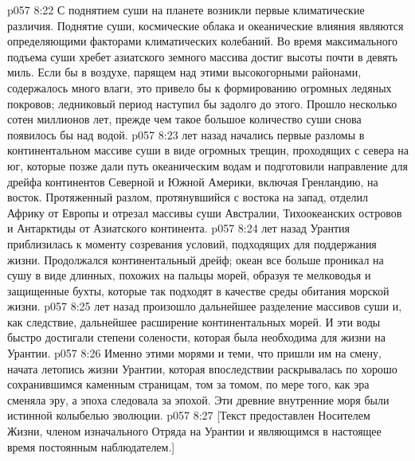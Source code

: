 \vs p057 8:22 С поднятием суши на планете возникли первые климатические различия. Поднятие суши, космические облака и океанические влияния являются определяющими факторами климатических колебаний. Во время максимального подъема суши хребет азиатского земного массива достиг высоты почти в девять миль. Если бы в воздухе, парящем над этими высокогорными районами, содержалось много влаги, это привело бы к формированию огромных ледяных покровов; ледниковый период наступил бы задолго до этого. Прошло несколько сотен миллионов лет, прежде чем такое большое количество суши снова появилось бы над водой.
\vs p057 8:23 \pc {} лет назад начались первые разломы в континентальном массиве суши в виде огромных трещин, проходящих с севера на юг, которые позже дали путь океаническим водам и подготовили направление для дрейфа континентов Северной и Южной Америки, включая Гренландию, на восток. Протяженный разлом, протянувшийся с востока на запад, отделил Африку от Европы и отрезал массивы суши Австралии, Тихоокеанских островов и Антарктиды от Азиатского континента.
\vs p057 8:24 \pc {} лет назад Урантия приблизилась к моменту созревания условий, подходящих для поддержания жизни. Продолжался континентальный дрейф; океан все больше проникал на сушу в виде длинных, похожих на пальцы морей, образуя те мелководья и защищенные бухты, которые так подходят в качестве среды обитания морской жизни.
\vs p057 8:25 \pc {} лет назад произошло дальнейшее разделение массивов суши и, как следствие, дальнейшее расширение континентальных морей. И эти воды быстро достигали степени солености, которая была необходима для жизни на Урантии.
\vs p057 8:26 Именно этими морями и теми, что пришли им на смену, начата летопись жизни Урантии, которая впоследствии раскрывалась по хорошо сохранившимся каменным страницам, том за томом, по мере того, как эра сменяла эру, а эпоха следовала за эпохой. Эти древние внутренние моря были истинной колыбелью эволюции.
\vsetoff
\vs p057 8:27 [Текст предоставлен Носителем Жизни, членом изначального Отряда на Урантии и являющимся в настоящее время постоянным наблюдателем.]
